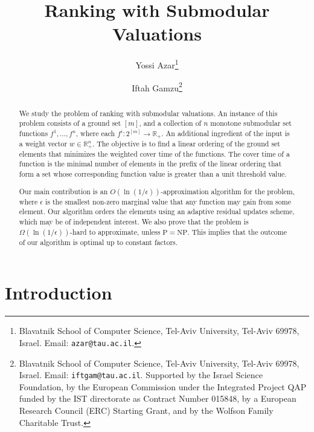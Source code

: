 \documentclass[11pt]{article}
\theoremstyle{plain}
\theoremstyle{definition}
\newcommand{\bbR}{\mathbb{R}}
\begin{document}
\begin{titlepage}
\title{Ranking with Submodular Valuations}
\author{
Yossi Azar\thanks{Blavatnik School of Computer Science, Tel-Aviv
University, Tel-Aviv 69978, Israel. Email: {\tt azar@tau.ac.il}.}
    \and
Iftah Gamzu\thanks{Blavatnik School of Computer Science, Tel-Aviv
University, Tel-Aviv 69978, Israel. Email: {\tt iftgam@tau.ac.il}.
Supported by the Israel Science Foundation, by the European
Commission under the Integrated Project QAP funded by the IST
directorate as Contract Number 015848, by a European Research
Council (ERC) Starting Grant, and by the Wolfson Family Charitable
Trust.} }
\date{}
\maketitle


\begin{abstract}

We study the problem of ranking with submodular valuations. An
instance of this problem consists of a ground set $[m]$, and a
collection of $n$ monotone submodular set functions $f^1, \ldots,
f^n$, where each $f^i: 2^{[m]} \to \bbR_+$. An additional
ingredient of the input is a weight vector $w \in \bbR_+^n$. The
objective is to find a linear ordering of the ground set elements
that minimizes the weighted cover time of the functions. The cover
time of a function is the minimal number of elements in the prefix
of the linear ordering that form a set whose corresponding
function value is greater than a unit threshold value.

Our main contribution is an $O(\ln(1 / \epsilon))$-approximation
algorithm for the problem, where $\epsilon$ is the smallest
non-zero marginal value that any function may gain from some
element. Our algorithm orders the elements using an adaptive
residual updates scheme, which may be of independent interest. We
also prove that the problem is $\Omega(\ln(1 / \epsilon))$-hard to
approximate, unless $\mathrm{P} = \mathrm{NP}$. This implies that
the outcome of our algorithm is optimal up to constant factors.
\end{abstract}

\thispagestyle{empty}
\end{titlepage}


\section{Introduction} \label{sec:Intro}
\end{document}
